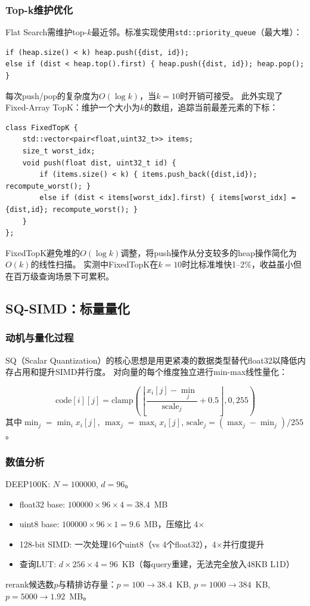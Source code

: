 \documentclass[11pt,a4paper]{article}
\begin{document}
\subsubsection{Top-k维护优化}

Flat Search需维护top-$k$最近邻。标准实现使用\texttt{std::priority\_queue}（最大堆）：
\begin{lstlisting}
if (heap.size() < k) heap.push({dist, id});
else if (dist < heap.top().first) { heap.push({dist, id}); heap.pop(); }
\end{lstlisting}
每次push/pop的复杂度为$O(\log k)$，当$k=10$时开销可接受。
此外实现了Fixed-Array TopK：维护一个大小为$k$的数组，追踪当前最差元素的下标：
\begin{lstlisting}
class FixedTopK {
    std::vector<pair<float,uint32_t>> items;
    size_t worst_idx;
    void push(float dist, uint32_t id) {
        if (items.size() < k) { items.push_back({dist,id}); recompute_worst(); }
        else if (dist < items[worst_idx].first) { items[worst_idx] = {dist,id}; recompute_worst(); }
    }
};
\end{lstlisting}
FixedTopK避免堆的$O(\log k)$调整，将push操作从分支较多的heap操作简化为$O(k)$的线性扫描。
实测中FixedTopK在$k=10$时比标准堆快1--2\%，收益虽小但在百万级查询场景下可累积。

\subsection{SQ-SIMD：标量量化}

\subsubsection{动机与量化过程}

SQ（Scalar Quantization）的核心思想是用更紧凑的数据类型替代float32以降低内存占用和提升SIMD并行度。
对向量的每个维度独立进行min-max线性量化：

\begin{equation}
\text{code}[i][j] = \text{clamp}\left(\left\lfloor\frac{x_i[j] - \min_j}{\text{scale}_j} + 0.5\right\rfloor, 0, 255\right)
\end{equation}
其中$\min_j = \min_i x_i[j]$, $\max_j = \max_i x_i[j]$, $\text{scale}_j = (\max_j - \min_j) / 255$。

\subsubsection{数值分析}

DEEP100K: $N=100000$, $d=96$。
\begin{itemize}[nosep]
    \item float32 base: $100000 \times 96 \times 4 = 38.4$~MB
    \item uint8 base: $100000 \times 96 \times 1 = 9.6$~MB，压缩比 4$\times$
    \item 128-bit SIMD: 一次处理16个uint8（vs 4个float32），4$\times$并行度提升
    \item 查询LUT: $d\times 256\times 4 = 96$~KB（每query重建，无法完全放入48KB L1D）
\end{itemize}
rerank候选数$p$与精排访存量：$p=100\to 38.4$~KB, $p=1000\to 384$~KB, $p=5000\to 1.92$~MB。
\end{document}
